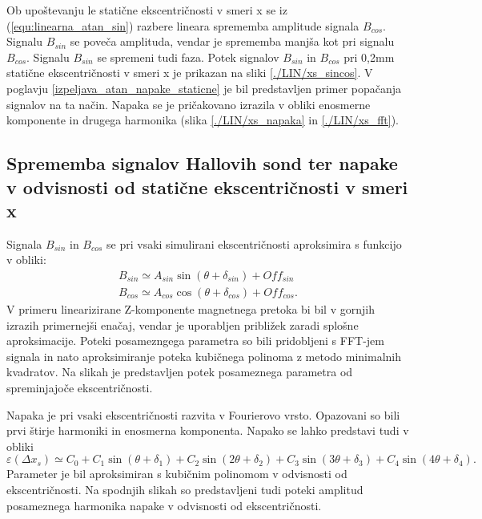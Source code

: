 Ob upoštevanju le statične ekscentričnosti v smeri x se iz (\ref{equ:linearna_atan_sin}) razbere lineara sprememba amplitude signala $B_{cos}$.
Signalu $B_{sin}$ se poveča amplituda, vendar je sprememba manjša kot pri signalu $B_{cos}$. Signalu $B_{sin}$ se spremeni tudi faza.
Potek signalov $B_{sin}$ in $B_{cos}$ pri 0,2mm statične ekscentričnosti v smeri x je prikazan na sliki \ref{./LIN/xs_sincos}.
V poglavju \ref{izpeljava_atan_napake_staticne} je bil predstavljen primer popačanja signalov na ta način.
Napaka se je pričakovano izrazila v obliki enosmerne komponente in drugega harmonika (slika \ref{./LIN/xs_napaka} in \ref{./LIN/xs_fft}).
\subsection{Sprememba signalov Hallovih sond ter napake v odvisnosti od statične ekscentričnosti v smeri x}
Signala $B_{sin}$ in $B_{cos}$ se pri vsaki simulirani ekscentričnosti aproksimira s funkcijo v obliki:
\begin{eqnarray}
B_{sin} \simeq A_{sin} \sin (\theta + \delta_{sin})+ Off_{sin}\\
B_{cos} \simeq A_{cos} \cos (\theta + \delta_{cos})+ Off_{cos}.
\end{eqnarray}
V primeru linearizirane Z-komponente magnetnega pretoka bi bil v gornjih izrazih primernejši enačaj, vendar je uporabljen približek zaradi splošne aproksimacije. Poteki posamezngega parametra so bili pridobljeni s FFT-jem signala in nato aproksimiranje poteka kubičnega polinoma z metodo minimalnih kvadratov.
Na slikah je predstavljen potek posameznega parametra od spreminjajoče ekscentričnosti.

Napaka je pri vsaki ekscentričnosti razvita v Fourierovo vrsto. Opazovani so bili prvi štirje harmoniki in enosmerna komponenta. Napako se lahko predstavi tudi v obliki
\begin{equation}
\varepsilon (\Delta x_s) \simeq C_0 + C_1 \sin (\theta + \delta_1)
+ C_2 \sin (2 \theta + \delta_2)
+ C_3 \sin (3 \theta + \delta_3)
+ C_4 \sin (4 \theta + \delta_4).
\end{equation}
Parameter je bil aproksimiran s kubičnim polinomom v odvisnosti od ekscentričnosti.
Na spodnjih slikah so predstavljeni tudi poteki amplitud posameznega harmonika napake v odvisnosti od ekscentričnosti.

